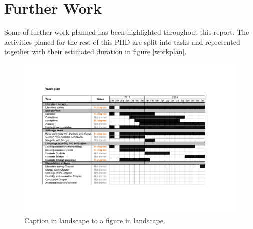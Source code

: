 \section{Further Work}
\label{future}

Some of further work planned has been highlighted throughout this report.
The activities planed for the rest of this PHD are split into tasks and represented together with their estimated duration in figure \ref{workplan}.

\begin{figure}
  \label{workplan}
    \includegraphics[height=0.9\vsize, width=1.1\hsize]{workplan.pdf}

    \caption{Caption in landscape to a figure in landscape.}
   \label{fig:LandscapeFigure}
\end{figure}
